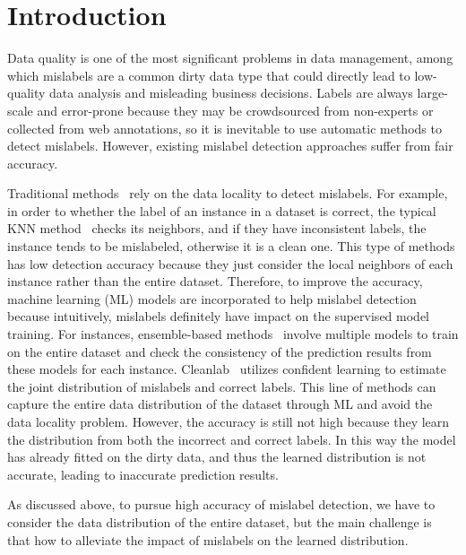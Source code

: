 \section{Introduction} 
\label{sec:intro}
Data quality is one of the most significant problems in data management, among which mislabels are a common dirty data type that could directly lead to  low-quality data analysis  and misleading business decisions. Labels are always large-scale and error-prone because they may be crowdsourced from non-experts or collected from web annotations, so it is inevitable to use automatic methods to detect mislabels. However, existing mislabel detection approaches suffer from fair accuracy.


 Traditional methods~\cite{} rely on the data locality to detect mislabels. For example, in order to whether the label of an instance in a dataset is correct, the typical KNN method~\cite{} checks its neighbors, and if they have inconsistent labels, the instance tends to be mislabeled, otherwise it is a clean one. This type of methods has low detection accuracy because they just consider the local neighbors of each instance rather than the entire dataset. Therefore, to improve the accuracy, machine learning (ML) models are incorporated to help mislabel detection~\cite{} because intuitively,  mislabels definitely have impact on the supervised model training. For instances, ensemble-based methods~\cite{} involve multiple models to train on the entire dataset and check the consistency of the prediction results from these models for each instance. Cleanlab~\cite{} utilizes confident learning to estimate the joint distribution of mislabels and correct labels. This line of methods can capture the entire data distribution of the dataset through ML and avoid the data locality problem. However, the accuracy is still not high because they learn the distribution from both the incorrect and correct labels. In this way the model has already fitted on the dirty data, and thus the learned distribution is not accurate, leading to inaccurate prediction results.


 As discussed above, to pursue high accuracy of mislabel detection, we have to consider the data distribution of the entire dataset, but the main challenge is that how to alleviate the impact of mislabels on the learned distribution.



